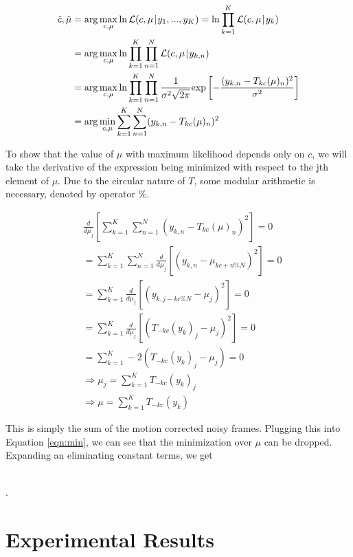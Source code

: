 \documentclass{article}
\newcommand\lpipe{\mkern1.5mu{|}\mkern1.5mu}
\begin{document}
\begin{align}
  \hat{c}, \hat{\mu} &= \arg \max_{c, \mu} \ln \mathcal{L}(c, \mu \lpipe y_1, ..., y_K) = \ln \prod_{k=1}^K \mathcal{L}(c, \mu \lpipe y_k) \nonumber \\
  &=\arg \max_{c, \mu} \ln \prod_{k=1}^K \prod_{n=1}^N \mathcal{L}(c, \mu \lpipe y_{k,n}) \nonumber \\
  &=\arg \max_{c, \mu} \ln \prod_{k=1}^K \prod_{n=1}^N \frac{1}{\sigma^2 \sqrt{2 \pi}} \text{exp} \left[- \frac{(y_{k,n} - T_{kc}(\mu)_n)^2}{\sigma^2}\right] \nonumber \\
  &=\arg \min_{c, \mu} \sum_{k=1}^K \sum_{n=1}^N (y_{k,n} - T_{kc}(\mu)_n)^2 \label{eqn:min}
\end{align}

To show that the value of $\mu$ with maximum likelihood depends only on $c$, we will take the derivative of the expression being minimized with respect to the jth element of $\mu$.  Due to the circular nature of $T$, some modular arithmetic is necessary, denoted by operator $\%$.

\begin{align*}
  &\frac{d}{d\mu_j}\left[\sum_{k=1}^K \sum_{n=1}^N (y_{k,n} - T_{kc}(\mu)_n)^2\right] = 0 \\
  &=\sum_{k=1}^K \sum_{n=1}^N \frac{d}{d\mu_j}\left[(y_{k,n} - \mu_{kc + n \% N})^2\right] = 0 \\
  &=\sum_{k=1}^K \frac{d}{d\mu_j}\left[(y_{k,j - kc \% N} - \mu_j)^2\right] = 0 \\
  &=\sum_{k=1}^K \frac{d}{d\mu_j}\left[(T_{-kc}(y_k)_j - \mu_j)^2\right] = 0 \\
  &=\sum_{k=1}^K -2(T_{-kc}(y_k)_j - \mu_j) = 0 \\
  &\Longrightarrow \mu_j = \sum_{k=1}^K T_{-kc}(y_k)_j \\
  &\Longrightarrow \mu = \sum_{k=1}^K T_{-kc}(y_k)
\end{align*}

This is simply the sum of the motion corrected noisy frames.  Plugging this into Equation \ref{eqn:min}, we can see that the minimization over $\mu$ can be dropped.  Expanding an eliminating constant terms, we get

\begin{align*}
\end{align*}


\newpage
.
\newpage

\section{Experimental Results}
\label{sec:results}
\end{document}
